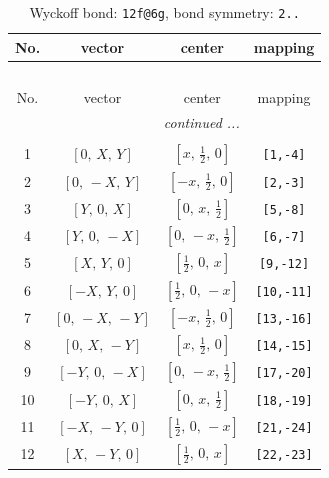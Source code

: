 \documentclass[fleqn,8pt]{jsarticle}
\begin{document}
\renewcommand{\arraystretch}{1.2}
\begin{longtable}{cccc}
\caption{Wyckoff bond: {\tt 12f@6g}, bond symmetry: {\tt 2..}}
 \\
 \hline \hline
No. & vector & center & mapping \\ \hline \endfirsthead

\multicolumn{3}{l}{\tablename\ \thetable{}} \\
 \hline \hline
No. & vector & center & mapping \\ \hline \endhead

 \hline \hline
\multicolumn{3}{r}{\footnotesize\it continued ...} \\ \endfoot

 \hline \hline
\multicolumn{3}{r}{} \\ \endlastfoot

1 & $\left[ 0,\, X,\, Y \right]$ & $\left[ x,\, \frac{1}{2},\, 0 \right]$ & {\tt [1,-4]} \\ \hline
2 & $\left[ 0,\, - X,\, Y \right]$ & $\left[ - x,\, \frac{1}{2},\, 0 \right]$ & {\tt [2,-3]} \\ \hline
3 & $\left[ Y,\, 0,\, X \right]$ & $\left[ 0,\, x,\, \frac{1}{2} \right]$ & {\tt [5,-8]} \\ \hline
4 & $\left[ Y,\, 0,\, - X \right]$ & $\left[ 0,\, - x,\, \frac{1}{2} \right]$ & {\tt [6,-7]} \\ \hline
5 & $\left[ X,\, Y,\, 0 \right]$ & $\left[ \frac{1}{2},\, 0,\, x \right]$ & {\tt [9,-12]} \\ \hline
6 & $\left[ - X,\, Y,\, 0 \right]$ & $\left[ \frac{1}{2},\, 0,\, - x \right]$ & {\tt [10,-11]} \\ \hline
7 & $\left[ 0,\, - X,\, - Y \right]$ & $\left[ - x,\, \frac{1}{2},\, 0 \right]$ & {\tt [13,-16]} \\ \hline
8 & $\left[ 0,\, X,\, - Y \right]$ & $\left[ x,\, \frac{1}{2},\, 0 \right]$ & {\tt [14,-15]} \\ \hline
9 & $\left[ - Y,\, 0,\, - X \right]$ & $\left[ 0,\, - x,\, \frac{1}{2} \right]$ & {\tt [17,-20]} \\ \hline
10 & $\left[ - Y,\, 0,\, X \right]$ & $\left[ 0,\, x,\, \frac{1}{2} \right]$ & {\tt [18,-19]} \\ \hline
11 & $\left[ - X,\, - Y,\, 0 \right]$ & $\left[ \frac{1}{2},\, 0,\, - x \right]$ & {\tt [21,-24]} \\ \hline
12 & $\left[ X,\, - Y,\, 0 \right]$ & $\left[ \frac{1}{2},\, 0,\, x \right]$ & {\tt [22,-23]} \\
\end{longtable}
\end{document}
